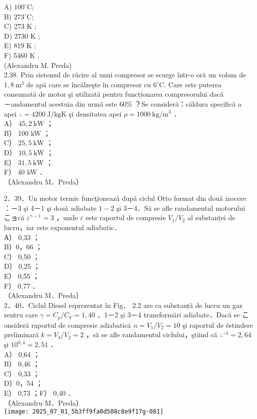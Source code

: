 A) $100^{\circ} \mathrm{C}$;\\
B) $273^{\circ} \mathrm{C}$;\\
C) 273 K ;\\
D) 2730 K ;\\
E) 819 K ;\\
F) 5460 K .\\
(Alexandru M. Preda)\\
2.38. Prin sistemul de răcire al unui compresor se scurge într-o oră un volum de $1,8 \mathrm{~m}^{3}$ de apă care se încălzeşte în compresor cu $6^{\circ} \mathrm{C}$. Care este puterea consumată de motor şi utilizată pentru funcționarea compresorului dacã\\
－andamentul acestuia din urmă este $60 \%$ ？Se consideră：căldura specifică a apei $\therefore=4200 \mathrm{~J} / \mathrm{kgK}$ şi densitatea apei $\rho=1000 \mathrm{~kg} / \mathrm{m}^{3}$ ．\\
A） $45,2 \mathrm{~kW}$ ；\\
B） 100 kW ；\\
C） $25,5 \mathrm{~kW}$ ；\\
D） $10,5 \mathrm{~kW}$ ；\\
E） $31,5 \mathrm{~kW}$ ；\\
F） 40 kW ．\\
（Alexandru M．Preda）

2．39．Un motor termic funcţionează după ciclul Otto format din două izocore ：－3 şi 4－1 şi două adiabate $1-2$ şi 3－4．Să se afle randamentul motorului こョcă $\varepsilon^{\gamma-1}=3$ ，unde $\varepsilon$ este raportul de compresie $V_{1} / V_{2}$ al substanței de lucru，iar este exponentul adiabatic．\\
А） 0,33 ；\\
B）0，66 ；\\
C） 0,50 ；\\
D） 0,25 ；\\
E） 0,55 ；\\
F） 0,77 ．\\
（Alexandru M．Preda）\\
2．40．Ciclul Diesel reprezentat în Fig． 2.2 are ca substanțã de lucru un gaz zentru care $\gamma=C_{p} / C_{V}=1,40$ ．1－2 şi 3－4 transformări adiabate．Dacă se こonsideră raportul de compresie adiabaticá $n=V_{1} / V_{2}=10$ şi raportul de éstindere preliminară $k=V_{3} / V_{2}=2$ ，să se afle randamentul ciclului，ştiind că $\therefore^{\therefore 4}=2,64$ şi $10^{0,4}=2,51$ ．\\
A） 0,64 ；\\
B） 0,46 ；\\
C） 0,33 ；\\
D）0，54 ；\\
E） 0,73 ；F） 0,40 ．\\
（Alexandru M．Preda）\\
\texttt{[image: 2025\_07\_01\_5b3ff9fa0d508c8e9f17g-081]}

